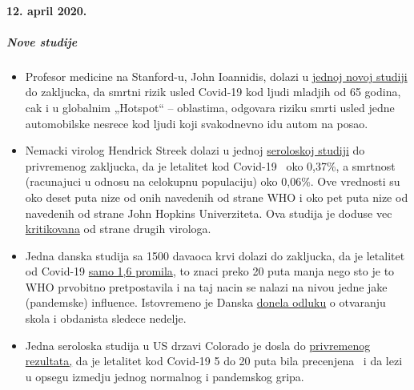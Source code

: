 \hypertarget{12-april-2020}{%
\paragraph{12. april 2020.}\label{12-april-2020}}

\hypertarget{nove-studije}{%
\subparagraph{\texorpdfstring{\textbf{Nove
studije}}{Nove studije}}\label{nove-studije}}

\begin{itemize}
\tightlist
\item
  Profesor medicine na Stanford-u, John Ioannidis, dolazi u
  \href{https://www.medrxiv.org/content/10.1101/2020.04.05.20054361v1}{jednoj
  novoj studiji} do zakljucka, da smrtni rizik usled Covid-19 kod ljudi
  mladjih od 65 godina, cak i u globalnim „Hotspot`` -- oblastima,
  odgovara riziku smrti usled jedne automobilske nesrece kod ljudi koji
  svakodnevno idu autom na posao.
\item
  Nemacki virolog Hendrick Streek dolazi u jednoj
  \href{https://www.land.nrw/sites/default/files/asset/document/zwischenergebnis_covid19_case_study_gangelt_0.pdf}{seroloskoj
  studiji} do privremenog zakljucka, da je letalitet kod Covid-19~ oko
  0,37\%, a smrtnost (racunajuci u odnosu na celokupnu populaciju) oko
  0,06\%. Ove vrednosti su oko deset puta nize od onih navedenih od
  strane WHO i oko pet puta nize od navedenih od strane John Hopkins
  Univerziteta. Ova studija je doduse vec
  \href{https://www.sueddeutsche.de/wissen/heinsberg-studie-herdenimmunitaet-kritik-1.4873480}{kritikovana}
  od strane drugih virologa.
\item
  Jedna danska studija sa 1500 davaoca krvi dolazi do zakljucka, da je
  letalitet od Covid-19
  \href{https://www.dr.dk/nyheder/indland/doedelighed-skal-formentlig-taelles-i-promiller-danske-blodproever-kaster-nyt-lys}{samo
  1,6 promila}, to znaci preko 20 puta manja nego sto je to WHO
  prvobitno pretpostavila i na taj nacin se nalazi na nivou jedne jake
  (pandemske) influence. Istovremeno je Danska
  \href{https://www.thelocal.dk/20200406/denmark-to-reopen-schools-and-kindergartens-next-week}{donela
  odluku} o otvaranju skola i obdanista sledece nedelje.
\item
  Jedna seroloska studija u US drzavi Colorado je dosla do
  \href{https://reason.com/2020/04/08/mass-antibody-testing-in-this-rural-colorado-county-sheds-light-on-covid-19s-prevalence-and-lethality/}{privremenog
  rezultata,} da je letalitet kod Covid-19 5 do 20 puta bila precenjena~
  i da lezi u opsegu izmedju jednog normalnog i pandemskog gripa.

\end{itemize}
